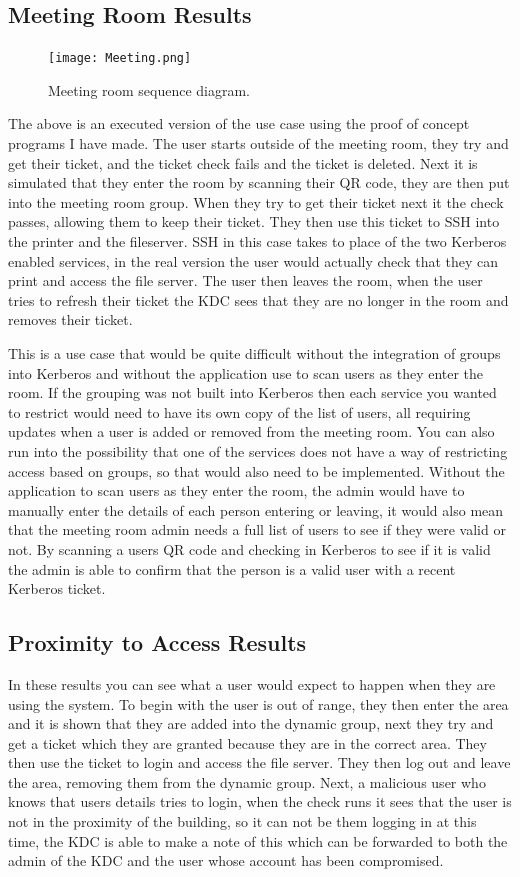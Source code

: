 \documentclass[]{report}   %
\begin{document}
\subsection{Meeting Room Results}
\begin{figure}[H]
\centering
\texttt{[image: Meeting.png]}
\caption{Meeting room sequence diagram.}
\end{figure}
The above is an executed version of the use case using the proof of concept programs I have made. The user starts outside of the meeting room, they try and get their ticket, and the ticket check fails and the ticket is deleted. Next it is simulated that they enter the room by scanning their QR code, they are then put into the meeting room group. When they try to get their ticket next it the check passes, allowing them to keep their ticket. They then use this ticket to SSH into the printer and the fileserver. SSH in this case takes to place of the two Kerberos enabled services, in the real version the user would actually check that they can print and access the file server. The user then leaves the room, when the user tries to refresh their ticket the KDC sees that they are no longer in the room and removes their ticket.

This is a use case that would be quite difficult without the integration of groups into Kerberos and without the application use to scan users as they enter the room. If the grouping was not built into Kerberos then each service you wanted to restrict would need to have its own copy of the list of users, all requiring updates when a user is added or removed from the meeting room. You can also run into the possibility that one of the services does not have a way of restricting access based on groups, so that would also need to be implemented. Without the application to scan users as they enter the room, the admin would have to manually enter the details of each person entering or leaving, it would also mean that the meeting room admin needs a full list of users to see if they were valid or not. By scanning a users QR code and checking in Kerberos to see if it is valid the admin is able to confirm that the person is a valid user with a recent Kerberos ticket.

\subsection{Proximity to Access Results}
In these results you can see what a user would expect to happen when they are using the system. To begin with the user is out of range, they then enter the area and it is shown that they are added into the dynamic group, next they try and get a ticket which they are granted because they are in the correct area. They then use the ticket to login and access the file server. They then log out and leave the area, removing them from the dynamic group. Next, a malicious user who knows that users details tries to login, when the check runs it sees that the user is not in the proximity of the building, so it can not be them logging in at this time, the KDC is able to make a note of this which can be forwarded to both the admin of the KDC and the user whose account has been compromised.
\end{document}
